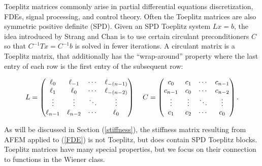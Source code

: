 \documentclass[review]{siamart251216}
\newcommand{\Toe}{{ L }}
\newcommand{\toe}{{ \ell }}
\begin{document}
Toeplitz matrices commonly arise in partial differential equations discretization, FDEs, signal processing, and control theory. Often the Toeplitz matrices are also symmetric positive definite (SPD). Given an SPD Toeplitz system $\Toe x = b$, the idea introduced by Strang and Chan \cite{Chan_Strang} is to use certain circulant preconditioners $C$ so that $C^{-1}Tx = C^{-1}b$ is solved in fewer iterations. 
A circulant matrix is a Toeplitz matrix, that additionally has the ``wrap-around'' property where the last entry of each row is the first entry of the subsequent row:
\begin{equ}[H]
	\begin{equation} 
		\Toe = \begin{pmatrix}
			\toe_0  &  \toe_{-1} & \cdots & \toe_{-(n-1)} \\
			\toe_{1} & \toe_0 & \cdots & \toe_{-(n-2)} \\
			\vdots & \vdots & \ddots & \vdots \\
			\toe_{n-1} & \toe_{n-2} & \cdots & \toe_0 
		\end{pmatrix} 
		\hspace{.15 in}
		C = \begin{pmatrix}
			c_0 & c_1 & \cdots & c_{n-1} \\
			c_{n-1} & c_0 & \cdots & c_{n-2} \\
			\vdots & \vdots & \ddots & \vdots \\
			c_{1} & c_{2} & \cdots & c_0 
		\end{pmatrix}.
	\end{equation}
	\caption{$\Toe$ is a Toeplitz matrix and $C$ is circulant.}
\end{equ}
As will be discussed in Section (\ref{stiffness}), the stiffness matrix resulting from AFEM applied to (\ref{FDE}) is not Toeplitz, but does contain SPD Toeplitz blocks. 
Toeplitz matrices have many special properties, but we focus on their connection to functions in the Wiener class. 
\end{document}
